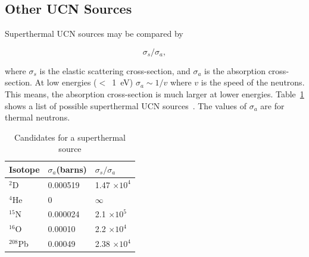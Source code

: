 \subsection{Other UCN Sources~\cite{Salvat2013,Atchison2009,Liu_thesis}}

Superthermal UCN sources may be compared by

\begin{equation}
\sigma_s / \sigma_a,
\end{equation}

where $\sigma_s$ is the elastic scattering cross-section, and
$\sigma_a$ is the absorption cross-section. At low energies ($<$~1~eV)
$\sigma_a \sim 1/v$ where $v$ is the speed of the neutrons. This
means, the absorption cross-section is much larger at lower energies.
Table~\ref{tab:other_sources} shows a list of possible superthermal
UCN sources~\cite{Liu_thesis}. The values of $\sigma_a$ are for
thermal neutrons.


\begin{table}
\begin{center}
\begin{tabular}{|l|l|l|}
\hline
Isotope & $\sigma_a$(barns) & $\sigma_s / \sigma_a$  \\
\hline
$^2$D & 0.000519 & 1.47 $\times 10^4$ \\
\hline
$^4$He & 0 & $\infty$ \\
\hline
$^{15}$N & 0.000024 & 2.1 $\times 10^5$ \\
\hline
$^{16}$O & 0.00010 & 2.2 $\times 10^4$ \\
\hline
$^{208}$Pb & 0.00049 &  2.38 $\times 10^4$\\
\hline
\end{tabular}
\end{center}
\caption{Candidates for a superthermal source\label{tab:other_sources}}
\end{table}

